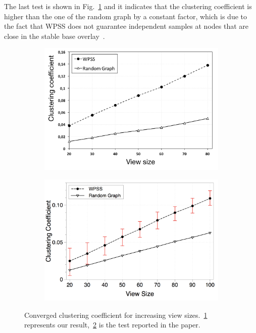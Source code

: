 The last test is shown in Fig.~\ref{fig:converged_clustering_coefficient} and it indicates that the clustering coefficient is higher than the one of the random graph by a constant factor, which is due to the fact that \ac{WPSS} does not guarantee independent samples at nodes that are close in the stable base overlay~\cite{wormhole}.

\begin{figure}
\centering
\begin{subfigure}{.5\textwidth}
  \centering
  \includegraphics[keepaspectratio=true, width=1\linewidth]{images/converged_clustering_coefficient}
  \caption{}
  \label{fig:converged_clustering_coefficient}
\end{subfigure}%
\begin{subfigure}{.5\textwidth}
  \centering
  \includegraphics[keepaspectratio=true, width=1\linewidth]{images/paper_converged_clustering_coefficient}
  \caption{}
  \label{fig:paper_converged_clustering_coefficient}
\end{subfigure}
\caption{Converged clustering coefficient for increasing view sizes.~\ref{fig:converged_clustering_coefficient} represents our result,~\ref{fig:paper_converged_clustering_coefficient} is the test reported in the paper.}
\label{fig:randomness_conv_clustering}
\end{figure}

